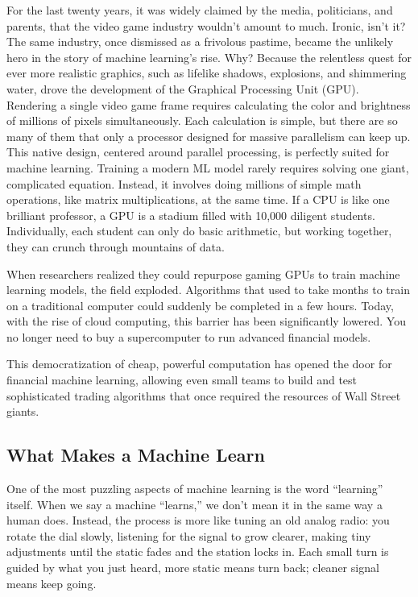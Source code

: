 For the last twenty years, it was widely claimed by the media, politicians, and parents, that the video game industry wouldn't amount to much.
Ironic, isn't it? The same industry, once dismissed as a frivolous pastime, became the unlikely hero in the story of machine learning's rise. 
Why? Because the relentless quest for ever more realistic graphics, such as lifelike shadows, explosions, and shimmering water, drove the development of the Graphical Processing Unit (GPU).
Rendering a single video game frame requires calculating the color and brightness of millions of pixels simultaneously. Each calculation is simple, but there are so many of them that only a processor designed for massive parallelism can keep up. This native design, centered around parallel processing, is perfectly suited for machine learning.
Training a modern ML model rarely requires solving one giant, complicated equation. 
Instead, it involves doing millions of simple math operations, like matrix multiplications, at the same time.
If a CPU is like one brilliant professor, a GPU is a stadium filled with 10,000 diligent students. Individually, each student can only do basic arithmetic, but working together, they can crunch through mountains of data.

When researchers realized they could repurpose gaming GPUs to train machine learning models, the field exploded. 
Algorithms that used to take months to train on a traditional computer could suddenly be completed in a few hours.
Today, with the rise of cloud computing, this barrier has been significantly lowered. 
You no longer need to buy a supercomputer to run advanced financial models. 

This democratization of cheap, powerful computation has opened the door for financial machine learning, allowing even small teams to build and test sophisticated trading algorithms that once required the resources of Wall Street giants.

\subsection{What Makes a Machine Learn}


One of the most puzzling aspects of machine learning is the word ``learning'' itself. 
When we say a machine ``learns,'' we don't mean it in the same way a human does. 
Instead, the process is more like tuning an old analog radio: you rotate the dial slowly, listening for the signal to grow clearer, making tiny adjustments until the static fades and the station locks in. 
Each small turn is guided by what you just heard, more static means turn back; cleaner signal means keep going.

